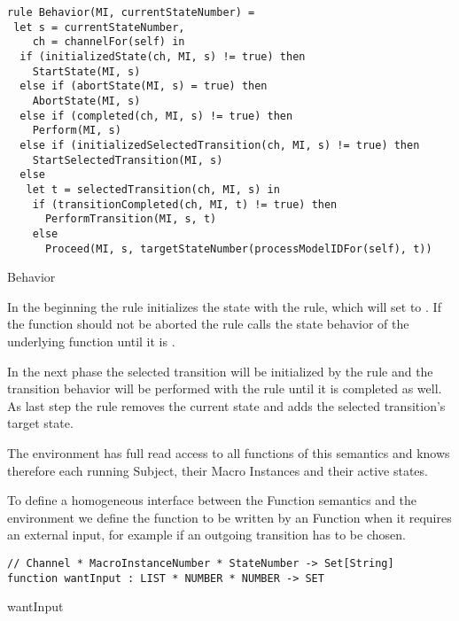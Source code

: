 \begin{listing}[htbp]
\begin{verbatim}
rule Behavior(MI, currentStateNumber) =
 let s = currentStateNumber,
    ch = channelFor(self) in
  if (initializedState(ch, MI, s) != true) then
    StartState(MI, s)
  else if (abortState(MI, s) = true) then
    AbortState(MI, s)
  else if (completed(ch, MI, s) != true) then
    Perform(MI, s)
  else if (initializedSelectedTransition(ch, MI, s) != true) then
    StartSelectedTransition(MI, s)
  else
   let t = selectedTransition(ch, MI, s) in
    if (transitionCompleted(ch, MI, t) != true) then
      PerformTransition(MI, s, t)
    else
      Proceed(MI, s, targetStateNumber(processModelIDFor(self), t))
\end{verbatim}
\caption{Behavior}
\label{lst:shortasm:Behavior}
\end{listing}


In the beginning the  rule initializes the state with the  rule, which will set  to . If the function should not be aborted the  rule calls the state behavior of the underlying function until it is .

In the next phase the selected transition will be initialized by the  rule and the transition behavior will be performed with the  rule until it is completed as well. As last step the  rule removes the current state and adds the selected transition's target state.


The environment has full read access to all functions of this semantics and knows therefore each running Subject, their Macro Instances and their active states.

To define a homogeneous interface between the Function semantics and the environment we define the function  to be written by an Function when it requires an external input, for example if an outgoing transition has to be chosen.



\begin{listing}[htbp]
\begin{verbatim}
// Channel * MacroInstanceNumber * StateNumber -> Set[String]
function wantInput : LIST * NUMBER * NUMBER -> SET
\end{verbatim}
\caption{wantInput}
\label{lst:shortasm:wantInput}
\end{listing}


